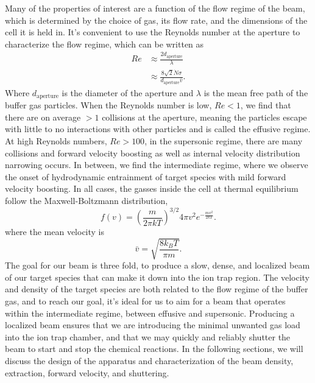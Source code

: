 Many of the properties of interest are a function of the flow regime of the beam, which is determined by the choice of gas, its flow rate, and the dimensions of the cell it is held in. It's convenient to use the Reynolds number at the aperture to characterize the flow regime, which can be written as
\begin{align}
	Re & \approx \frac{2 d_{\mathrm{aperture}}}{\lambda} \nonumber \\
	& \approx \frac{8\sqrt{2} \dot{N} \sigma}{d_{\mathrm{aperture}} \bar{v}}. \label{eq: reynolds}
\end{align}
Where $d_{\mathrm{aperture}}$ is the diameter of the aperture and $\lambda$ is the mean free path of the buffer gas particles.\cite{Hutzler2012} When the Reynolds number is low, $Re<1$, we find that there are on average $>1$ collisions at the aperture, meaning the particles escape with little to no interactions with other particles and is called the effusive regime. At high Reynolds numbers, $Re>100$, in the supersonic regime, there are many collisions and forward velocity boosting as well as internal velocity distribution narrowing occurs. In between, we find the intermediate regime, where we observe the onset of hydrodynamic entrainment of target species with mild forward velocity boosting. In all cases, the gasses inside the cell at thermal equilibrium follow the Maxwell-Boltzmann distribution,
\begin{equation}
	f(v) = \left(\frac{m}{2 \pi k T}\right)^{3/2}4 \pi v^2 e^{-\frac{m v^2}{2 k T}}.
	\label{eq: mb_distribution}
\end{equation}
where the mean velocity is
\begin{equation}
	\bar{v} = \sqrt{\frac{8 k_B T}{\pi m}}.
	\label{eq: mb_mean}
\end{equation}
The goal for our beam is three fold, to produce a slow, dense, and localized beam of our target species that can make it down into the ion trap region. The velocity and density of the target species are both related to the flow regime of the buffer gas, and to reach our goal, it's ideal for us to aim for a beam that operates within the intermediate regime, between effusive and supersonic. Producing a localized beam ensures that we are introducing the minimal unwanted gas load into the ion trap chamber, and that we may quickly and reliably shutter the beam to start and stop the chemical reactions. In the following sections, we will discuss the design of the apparatus and characterization of the beam density, extraction, forward velocity, and shuttering.